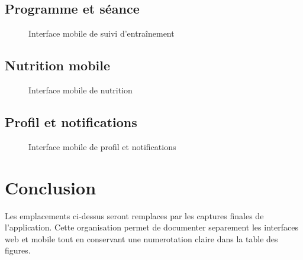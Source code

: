 \subsection{Programme et séance}
\begin{figure}[H]
\centering
{}
\caption{Interface mobile de suivi d'entraînement}
\end{figure}

\subsection{Nutrition mobile}
\begin{figure}[H]
\centering
{}
\caption{Interface mobile de nutrition}
\end{figure}

\subsection{Profil et notifications}
\begin{figure}[H]
\centering
{}
\caption{Interface mobile de profil et notifications}
\end{figure}

\section{Conclusion}
Les emplacements ci-dessus seront remplaces par les captures finales de l'application. Cette organisation permet de documenter separement les interfaces web et mobile tout en conservant une numerotation claire dans la table des figures.
